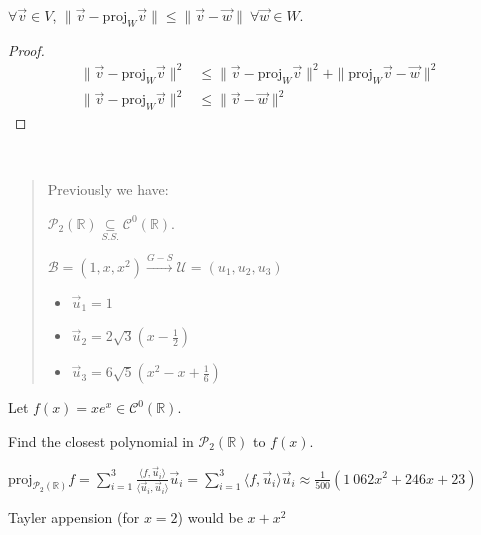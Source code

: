 \documentclass[11pt,fleqn]{book} %
\begin{document}
\setcounter{section}{0}
\setcounter{dummy}{6}
\begin{theorem}
    $\forall \vec{v} \in V$, $\|\vec{v} - \mathrm{proj}_W \vec{v} \| \le \| \vec{v} - \vec{w} \| ~ \forall \vec{w} \in W$.
\end{theorem}
\setcounter{section}{4}

\begin{proof}
    \begin{align*}
        \|\vec{v} - \mathrm{proj}_W\vec{v}\|^2
        &\le \|\vec{v} - \mathrm{proj}_W\vec{v}\|^2 + \|\mathrm{proj}_W \vec{v} - \vec{w}\|^2
        \\
        \|\vec{v} - \mathrm{proj}_W\vec{v}\|^2
        &\le \|\vec{v} - \vec{w}\|^2
    \end{align*}
\end{proof}

\begin{example}
{~~~}

    \begin{quote}
        Previously we have:

        $\mathcal{P}_2(\mathbb{R}) \underset{S.S.}{\subseteq} \mathcal{C}^0(\mathbb{R})$.

        $\mathcal{B} = (1, x, x^2) \overset{G-S}{\longrightarrow} \mathcal{U} = (u_1, u_2, u_3)$

        \begin{itemize}
            \item $\vec{u}_1 = 1$
            \item $\vec{u}_2 = 2\sqrt{3}(x - \frac{1}{2})$
            \item $\vec{u}_3 = 6\sqrt{5}(x^2 - x + \frac{1}{6})$
        \end{itemize}
    \end{quote}

    Let $f(x) = xe^x \in \mathcal{C}^0(\mathbb{R})$.

    Find the closest polynomial in $\mathcal{P}_2(\mathbb{R})$ to $f(x)$.

    $\displaystyle \mathrm{proj}_{\mathcal{P}_2(\mathbb{R})} f = \sum_{i=1}^3 \frac{\langle f, \vec{u}_i \rangle}{\langle \vec{u}_i, \vec{u}_i \rangle} \vec{u}_i = \sum_{i=1}^3 \langle f, \vec{u}_i \rangle \vec{u}_i \approx \frac{1}{500}(1~062 x^2 + 246x + 23)$

    Tayler appension (for $x = 2$) would be $x + x^2$

    \begin{center}
    \end{center}
\end{example}
\end{document}
